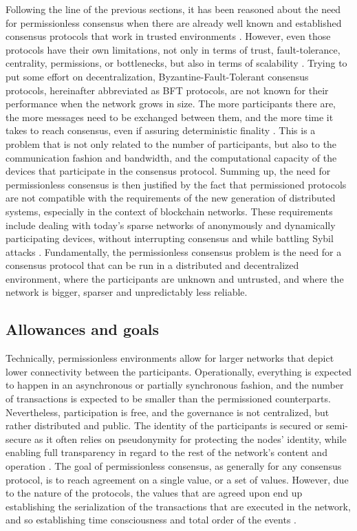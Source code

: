\documentclass[journal]{IEEEtran}
\begin{document}
Following the line of the previous sections, it has been reasoned about the need 
for permissionless consensus when there are already well known and established consensus protocols
that work in trusted environments \cite{castro1999practical, miller2016honey}. However, even those protocols have
their own limitations, not only in terms of trust, fault-tolerance, centrality, permissions,
or bottlenecks, but also in terms of scalability \cite{miller2016honey}. Trying to put some effort on decentralization, 
Byzantine-Fault-Tolerant consensus protocols, hereinafter abbreviated as BFT protocols, 
are not known for their performance when the network grows
in size. The more participants there are, the more messages need to be exchanged
between them, and the more time it takes to reach consensus, even if assuring deterministic finality \cite{decker2016bitcoin}. 
This is a problem that is not only related to the number of participants, but also to the
communication fashion and bandwidth, and the computational capacity of the devices that
participate in the consensus protocol. 
Summing up, the need for permissionless consensus is then justified by the fact that
permissioned protocols are not compatible with the requirements of the new generation of
distributed systems, especially in the context of blockchain networks. 
These requirements include dealing with today's sparse networks of anonymously and dynamically
participating devices, without interrupting consensus and while battling Sybil attacks \cite{8629877, survey-dist-consensus}.
Fundamentally, the permissionless consensus problem is the need for a consensus protocol that
can be run in a distributed and decentralized environment, where the participants are unknown and untrusted,
and where the network is bigger, sparser and unpredictably less reliable.

\subsection{Allowances and goals}

Technically, permissionless environments allow for larger networks
that depict lower connectivity between the participants. Operationally,
everything is expected to happen in an asynchronous or partially synchronous fashion, 
and the number of transactions is expected to be smaller than the 
permissioned counterparts. Nevertheless, participation is free, and the
governance is not centralized, but rather distributed and public. 
The identity of the participants is secured or semi-secure as it often relies on
pseudonymity for protecting the nodes' identity, while enabling full transparency 
in regard to the rest of the network's content and operation \cite{xiao2019distributed}.
The goal of permissionless consensus, as generally for any consensus protocol, is to reach
agreement on a single value, or a set of values. However, due to the nature of the
protocols, the values that are agreed upon end up establishing the serialization of the
transactions that are executed in the network, and so establishing time consciousness and 
total order of the events \cite{8629877}.
\end{document}
